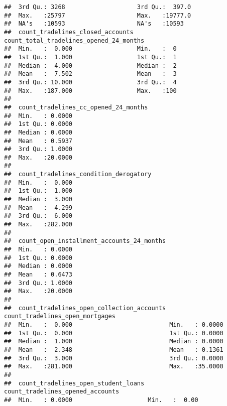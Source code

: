\documentclass[ignorenonframetext,]{beamer}
\begin{document}
\begin{frame}[fragile]
\begin{verbatim}
##  3rd Qu.: 3268                    3rd Qu.:  397.0                 
##  Max.   :25797                    Max.   :19777.0                 
##  NA's   :10593                    NA's   :10593                   
##  count_tradelines_closed_accounts count_total_tradelines_opened_24_months
##  Min.   :  0.000                  Min.   :  0                            
##  1st Qu.:  1.000                  1st Qu.:  1                            
##  Median :  4.000                  Median :  2                            
##  Mean   :  7.502                  Mean   :  3                            
##  3rd Qu.: 10.000                  3rd Qu.:  4                            
##  Max.   :187.000                  Max.   :100                            
##                                                                          
##  count_tradelines_cc_opened_24_months
##  Min.   : 0.0000                     
##  1st Qu.: 0.0000                     
##  Median : 0.0000                     
##  Mean   : 0.5937                     
##  3rd Qu.: 1.0000                     
##  Max.   :20.0000                     
##                                      
##  count_tradelines_condition_derogatory
##  Min.   :  0.000                      
##  1st Qu.:  1.000                      
##  Median :  3.000                      
##  Mean   :  4.299                      
##  3rd Qu.:  6.000                      
##  Max.   :282.000                      
##                                       
##  count_open_installment_accounts_24_months
##  Min.   : 0.0000                          
##  1st Qu.: 0.0000                          
##  Median : 0.0000                          
##  Mean   : 0.6473                          
##  3rd Qu.: 1.0000                          
##  Max.   :20.0000                          
##                                           
##  count_tradelines_open_collection_accounts count_tradelines_open_mortgages
##  Min.   :  0.000                           Min.   : 0.0000                
##  1st Qu.:  0.000                           1st Qu.: 0.0000                
##  Median :  1.000                           Median : 0.0000                
##  Mean   :  2.348                           Mean   : 0.1361                
##  3rd Qu.:  3.000                           3rd Qu.: 0.0000                
##  Max.   :281.000                           Max.   :35.0000                
##                                                                           
##  count_tradelines_open_student_loans count_tradelines_opened_accounts
##  Min.   : 0.0000                     Min.   :  0.00                  

\end{verbatim}
\end{frame}
\end{document}
